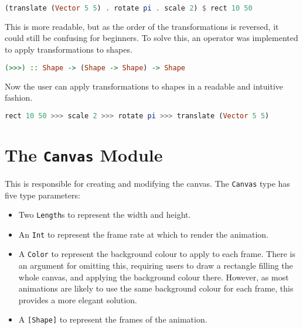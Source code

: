 \documentclass[../main.tex]{subfiles}
\begin{document}
                \begin{lstlisting}[language={Haskell}]
(translate (Vector 5 5) . rotate pi . scale 2) $ rect 10 50\end{lstlisting}

                This is more readable, but as the order of the transformations is reversed, it
                    could still be confusing for beginners.
                To solve this, an operator was implemented to apply transformations to shapes.

                \begin{lstlisting}[language={Haskell}, label={lst:transform}, caption={The 
                    transformation application (\texttt{>>>}) operator.}]
(>>>) :: Shape -> (Shape -> Shape) -> Shape\end{lstlisting}

                Now the user can apply transformations to shapes in a readable and intuitive
                    fashion.

                \begin{lstlisting}[language={Haskell}]
rect 10 50 >>> scale 2 >>> rotate pi >>> translate (Vector 5 5)\end{lstlisting}

    \section{The \texttt{Canvas}
        Module} This is responsible for creating and modifying the canvas.
        The \texttt{Canvas} type has five type parameters:
        \begin{itemize}
            \item Two \texttt{Length}s to represent the width and height.
            \item An \texttt{Int} to represent the frame rate at which to render the animation.
            \item A \texttt{Color} to represent the background colour to apply to each frame.
                  There is an argument for omitting this, requiring users to draw a rectangle
                      filling the whole canvas, and applying the background colour there.
                  However, as most animations are likely to use the same background colour for
                      each frame, this provides a more elegant solution.
            \item A \texttt{[Shape]} to represent the frames of the animation.
        \end{itemize}
\end{document}
